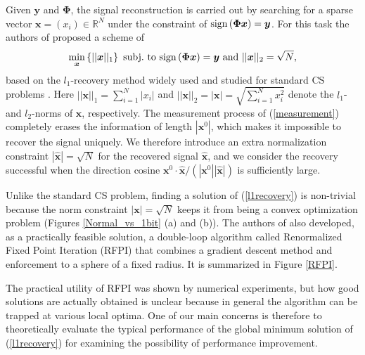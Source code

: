 \documentclass[12pt]{iopart}
\newcommand{\vm}[1]{\boldsymbol{#1}}
\begin{document}
Given $\vm{y}$ and $\vm{\Phi}$, the signal reconstruction is carried out by searching for a sparse vector $\vm{x} =(x_i) \in \mathbb{R}^N$ under the constraint of ${\rm sign}\left (\vm{\Phi} \vm{x} \right )=\vm{y}$. For this task the authors of \cite{1bitCS} proposed a scheme of 
\begin{eqnarray}
\mathop{\rm min}_{\vm{x} } \left \{||\vm{x}||_1 \right \} \ {\rm subj. \ to} \ 
{\rm sign}\left (\vm{\Phi} \vm{x} \right )=\vm{y} \ {\rm and} \
||\vm{x}||_2=\sqrt{N}, 
\label{l1recovery}
\end{eqnarray}
based on the $l_1$-recovery method widely used and studied for standard CS problems \cite{CandesWakin2008}. Here $|| \vm{x}||_1 =\sum_{i=1}^N |x_i|$ and $||\vm{x}||_2=|\vm{x}|=\sqrt{\sum_{i=1}^N x_i^2}$ denote the $l_1$- and $l_2$-norms of $\vm{x}$, respectively. The measurement process of (\ref{measurement}) completely erases the information of length $|\vm{x}^0|$, which makes it impossible to recover the signal uniquely. We therefore introduce an extra normalization constraint $|\hat{\vm{x}}|=\sqrt{N}$ for the recovered signal $\hat{\vm{x}}$, and we consider the recovery successful when the direction cosine ${\vm{x}}^0 \cdot \hat{\vm{x}}/(|\vm{x}^0| |\hat{\vm{x}}|)$ is sufficiently large. 

Unlike the standard CS problem, finding a solution of (\ref{l1recovery}) is non-trivial because the norm constraint $|{\vm{x}}|=\sqrt{N}$ keeps it from being a convex optimization problem (Figures \ref{Normal_vs_1bit} (a) and (b)). The authors of \cite{1bitCS} also developed, as a practically feasible solution, a double-loop algorithm called Renormalized Fixed Point Iteration (RFPI) that combines a gradient descent method and enforcement to a sphere of a fixed radius. It is summarized in Figure \ref{RFPI}. 

The practical utility of RFPI was shown by numerical experiments, but 
how good solutions are actually obtained is unclear 
because in general 
the algorithm can be trapped at various local optima. 
One of our main concerns is therefore to theoretically evaluate the typical performance of the global minimum solution of (\ref{l1recovery})
for examining the possibility of performance improvement. 
\end{document}
